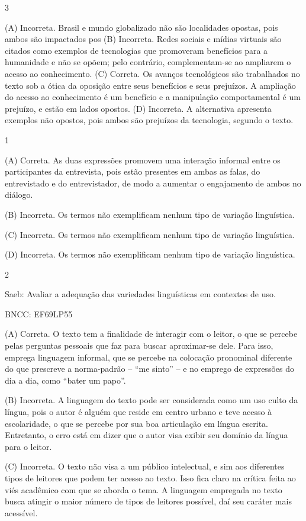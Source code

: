 \num{3}

(A) Incorreta. Brasil e mundo globalizado não são localidades opostas,
pois ambos são impactados pos
(B) Incorreta. Redes sociais e mídias
virtuais são citados como exemplos de tecnologias que promoveram
benefícios para a humanidade e não se opõem; pelo contrário,
complementam-se ao ampliarem o acesso ao conhecimento. 
(C) Correta. Os
avanços tecnológicos são trabalhados no texto sob a ótica da oposição
entre seus benefícios e seus prejuízos. A ampliação do acesso ao
conhecimento é um benefício e a manipulação comportamental é um
prejuízo, e estão em lados opostos. 
(D) Incorreta. A alternativa
apresenta exemplos não opostos, pois ambos são prejuízos da tecnologia,
segundo o texto.


\num{1}

(A) Correta. As duas expressões promovem uma interação informal entre os
participantes da entrevista, pois estão presentes em ambas as falas, do
entrevistado e do entrevistador, de modo a aumentar o engajamento de
ambos no diálogo.

(B) Incorreta. Os termos não exemplificam nenhum tipo de variação
linguística.

(C) Incorreta. Os termos não exemplificam nenhum tipo de variação
linguística.

(D) Incorreta. Os termos não exemplificam nenhum tipo de variação
linguística.

\num{2}

Saeb: Avaliar a adequação das variedades linguísticas em contextos de uso.

BNCC: EF69LP55

(A) Correta. O texto tem a finalidade de interagir com o leitor, o que
se percebe pelas perguntas pessoais que faz para buscar aproximar-se
dele. Para isso, emprega linguagem informal, que se percebe na colocação
pronominal diferente do que prescreve a norma-padrão -- ``me sinto'' --
e no emprego de expressões do dia a dia, como ``bater um papo''.

(B) Incorreta. A linguagem do texto pode ser considerada como um uso
culto da língua, pois o autor é alguém que reside em centro urbano e
teve acesso à escolaridade, o que se percebe por sua boa articulação em
língua escrita. Entretanto, o erro está em dizer que o autor visa exibir
seu domínio da língua para o leitor.

(C) Incorreta. O texto não visa a um público intelectual, e sim aos
diferentes tipos de leitores que podem ter acesso ao texto. Isso fica
claro na crítica feita ao viés acadêmico com que se aborda o tema. A
linguagem empregada no texto busca atingir o maior número de tipos de
leitores possível, daí seu caráter mais acessível.

